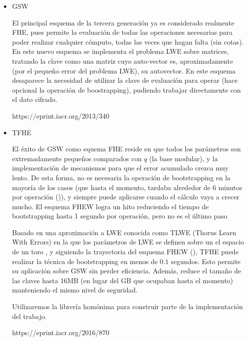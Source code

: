 \begin{itemize}

  \item GSW

  El principal esquema de la tercera generación ya es considerado realmente FHE, pues permite la evaluación de todas las operaciones necesarias para poder realizar cualquier cómputo, todas las veces que hagan falta (sin cotas). En este nuevo esquema se implementa el problema LWE sobre matrices, tratando la clave como una matriz cuyo auto-vector es, aproximadamente (por el pequeño error del problema LWE), su autovector. En este esquema desaparece la necesidad de utilizar la clave de evaluación para operar (hace opcional la operación de boostrapping), pudiendo trabajar directamente con el dato cifrado.

  https://eprint.iacr.org/2013/340

  \item TFHE

  El éxito de GSW como equema FHE reside en que todos los parámetros son extremadamente pequeños comparados con $q$ (la base modular), y la implementación de mecanismos para que el error acumulado crezca muy lento. De esta forma, no es necesaria la operación de bootstrapping en la mayoría de los casos (que hasta el momento, tardaba alrededor de 6 minutos por operación (\cite{ducas_fhew:_2014})), y siempre puede aplicarse cuando el cálculo vaya a crecer mucho. El esquema FHEW logra un hito reduciendo el tiempo de bootstrapping hasta 1 segundo por operación, pero no es el último paso

  Basado en una aproximación a LWE conocida como TLWE (Thorus Learn With Errors) en la que los parámetros de LWE se definen sobre un el espacio de un toro \cite{cheon_faster_2016}, y siguiendo la trayectoria del esquema FHEW (\cite{ducas_fhew:_2014}), TFHE puede realizar la técnica de bootstrapping en menos de $0.1$ segundos. Esto permite su aplicación sobre GSW sin perder eficiencia. Además, reduce el tamaño de las claves hasta 16MB (en lugar del GB que ocupaban hasta el momento) manteniendo el mismo nivel de seguridad.

  Utilizaremos la librería homónima para construir parte de la implementación del trabajo.

  https://eprint.iacr.org/2016/870

\end{itemize}
